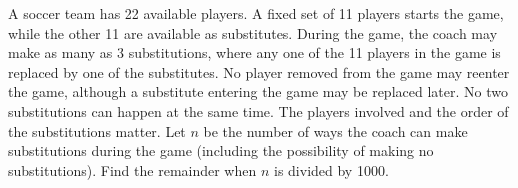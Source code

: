 A soccer team has 22 available players. A fixed set of 11 players starts the game, while the other 11 are available as substitutes. During the game, the coach may make as many as 3 substitutions, where any one of the 11 players in the game is replaced by one of the substitutes. No player removed from the game may reenter the game, although a substitute entering the game may be replaced later. No two substitutions can happen at the same time. The players involved and the order of the substitutions matter. Let $n$ be the number of ways the coach can make substitutions during the game (including the possibility of making no substitutions). Find the remainder when $n$ is divided by 1000.